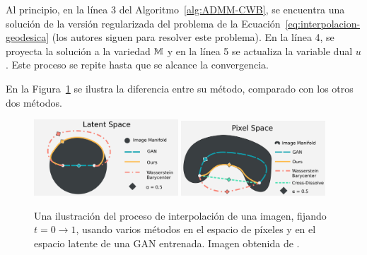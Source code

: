 Al principio, en la línea 3 del Algoritmo~\ref{alg:ADMM-CWB}, se encuentra una solución de la versión regularizada del problema de la Ecuación~\eqref{eq:interpolacion-geodesica} (los autores siguen \cite{cuturi2016smoothed} para resolver este problema). En la línea 4, se proyecta la solución a la variedad $\mathbb{M}$ y en la línea 5 se actualiza la variable dual $u$. Este proceso se repite hasta que se alcance la convergencia.

En la Figura~\ref{fig:latent-pixel-space} se ilustra la diferencia entre su método, comparado con los otros dos métodos.

\begin{figure}[H]
    \centering
    \includegraphics[width=0.48\textwidth]{img/cbw/latent-space.png}
    \includegraphics[width=0.48\textwidth]{img/cbw/pixel-space.png}
    \caption{
        Una ilustración del proceso de interpolación de una imagen, fijando $t = 0 \to 1$, usando varios métodos en el espacio de píxeles y en el espacio latente de una GAN entrenada.
        Imagen obtenida de \cite{simon2020barycenters}.
    }
    \label{fig:latent-pixel-space}
\end{figure}
